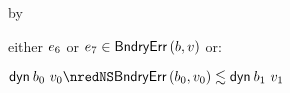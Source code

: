 {\begin{lamportproof*}
\begin{pfproof}
\begin{pfproof}
{          \)}
            \begin{pfproof}
              by 
            \end{pfproof}
          \qedstep
            \begin{pfproof}
              either $\sexpr_6$ or $\sexpr_7 \in \boundaryerror{\sbnd}{\svalue}$ or:
              \begin{mathpar}
              \end{mathpar}
            \end{pfproof}
        \end{pfproof}
        \begin{pfproof}
          \qedstep
            \begin{pfproof}
              $\edynb{\sbnd_0}{\svalue_0} \nredNS \rexpr{\boundaryerror{\sbnd_0}{\svalue_0}}{\edynb{\sbnd_1}{\svalue_1}}$
            \end{pfproof}
        \end{pfproof}
    \end{pfproof}


\end{lamportproof*}}
